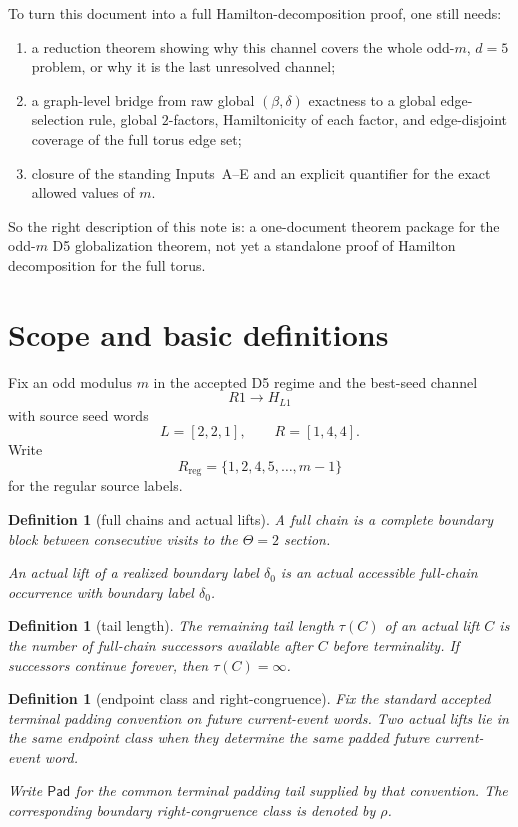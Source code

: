 \documentclass[11pt]{article}
\newtheorem{definition}[theorem]{Definition}
\newcommand{\Pad}{\mathsf{Pad}}
\begin{document}
To turn this document into a full Hamilton-decomposition proof, one still
needs:
\begin{enumerate}[label=\textup{(\arabic*)},leftmargin=2.5em]
\item a reduction theorem showing why this channel covers the whole odd-$m$,
      $d=5$ problem, or why it is the last unresolved channel;
\item a graph-level bridge from raw global $(\beta,\delta)$ exactness to a
      global edge-selection rule, global $2$-factors, Hamiltonicity of each
      factor, and edge-disjoint coverage of the full torus edge set;
\item closure of the standing Inputs~A--E and an explicit quantifier for the
      exact allowed values of $m$.
\end{enumerate}

So the right description of this note is: a one-document theorem package for
the odd-$m$ D5 globalization theorem, not yet a standalone proof of Hamilton
decomposition for the full torus.

\section{Scope and basic definitions}

Fix an odd modulus $m$ in the accepted D5 regime and the best-seed channel
\[
R1 \to H_{L1}
\]
with source seed words
\[
L=[2,2,1], \qquad R=[1,4,4].
\]
Write
\[
R_{\mathrm{reg}}=\{1,2,4,5,\dots,m-1\}
\]
for the regular source labels.

\begin{definition}[full chains and actual lifts]
A \emph{full chain} is a complete boundary block between consecutive visits to
the $\Theta=2$ section.

An \emph{actual lift} of a realized boundary label $\delta_0$ is an actual
accessible full-chain occurrence with boundary label $\delta_0$.
\end{definition}

\begin{definition}[tail length]
The \emph{remaining tail length} $\tau(C)$ of an actual lift $C$ is the number
of full-chain successors available after $C$ before terminality. If successors
continue forever, then $\tau(C)=\infty$.
\end{definition}

\begin{definition}[endpoint class and right-congruence]
Fix the standard accepted terminal padding convention on future current-event
words. Two actual lifts lie in the same \emph{endpoint class} when they
determine the same padded future current-event word.

Write $\Pad$ for the common terminal padding tail supplied by that convention.
The corresponding boundary right-congruence class is denoted by $\rho$.
\end{definition}
\end{document}
